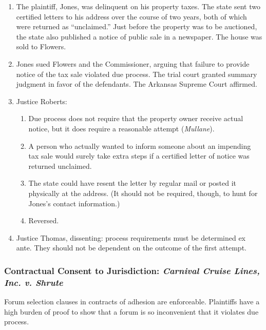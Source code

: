 \begin{enumerate}
    \item The plaintiff, Jones, was delinquent on his property taxes. The 
    state sent two certified letters to his address over the course of two 
    years, both of which were returned as ``unclaimed.'' Just before the 
    property was to be auctioned, the state also published a notice of public 
    sale in a newspaper. The house was sold to Flowers.
    \item Jones sued Flowers and the Commissioner, arguing that failure to 
    provide notice of the tax sale violated due process. The trial court 
    granted summary judgment in favor of the defendants. The Arkansas Supreme 
    Court affirmed.
    \item Justice Roberts:
    \begin{enumerate}
        \item Due process does not require that the property owner receive 
        actual notice, but it does require a reasonable attempt 
        (\emph{Mullane}).
        \item A person who actually wanted to inform someone about an 
        impending tax sale would surely take extra steps if a certified letter 
        of notice was returned unclaimed.
        \item The state could have resent the letter by regular mail or posted 
        it physically at the address. (It should not be required, though, to 
        hunt for Jones's contact information.)
        \item Reversed.
    \end{enumerate}
    \item Justice Thomas, dissenting: process requirements must be determined ex ante. They should not be dependent on the outcome of the first attempt.
\end{enumerate}

\subsubsection{Contractual Consent to Jurisdiction: \emph{Carnival Cruise 
Lines, Inc. v. Shrute}}

Forum selection clauses in contracts of adhesion are enforceable. Plaintiffs 
have a high burden of proof to show that a forum is so inconvenient that it 
violates due process.

